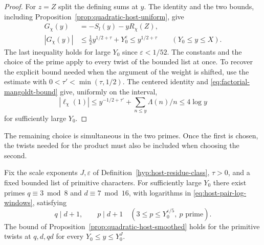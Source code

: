 \begin{proof}
For \(z=Z\) split the defining sums at \(y\). The identity and the
two bounds, including Proposition~\ref{prop:quadratic-host-uniform}, give
\[
 \begin{aligned}
 G_\chi(y)&=-S_l(y)-yR_\chi(Z),\\
 |G_\chi(y)|&\le \tfrac12 y^{1/2+\tau}+Y_0^\varepsilon
             \le y^{1/2+\tau}\qquad (Y_0\le y\le X).
 \end{aligned}
\]
The last inequality holds for large \(Y_0\) since \(\varepsilon<1/52\). The constants and the choice of the prime apply to
every twist of the bounded list at once. To recover the explicit bound needed when the argument of the weight is shifted, use the estimate with \(0<\tau'<\min(\tau,1/2)\). The centered identity and \eqref{eq:factorial-mangoldt-bound} give, uniformly on the interval,
\[
 |\ell_\chi(1)|\le y^{-1/2+\tau'}+\sum_{n\le y}\Lambda(n)/n
              \le 4\log y
\]
for sufficiently large \(Y_0\).

\end{proof}

The remaining choice is simultaneous in the two primes. Once the first is chosen, the
twists needed for the product must also be included when choosing the second.

\begin{proposition}\label{prop:common-host-prime-pair}
Fix the scale exponents \(J,\varepsilon\) of
Definition~\ref{hyp:host-residue-class}, \(\tau>0\), and a fixed
bounded list of primitive characters. For sufficiently large
\(Y_0\) there exist primes \(q\equiv3\bmod8\) and
\(d\equiv7\bmod16\), with logarithms in \eqref{eq:host-pair-log-windows}, satisfying 
\[
 q\mid d+1,\qquad p\mid d+1\quad(3\le p\le Y_0^{\varepsilon/5},\ p\text{ prime}).
\]
 The bound of
Proposition~\ref{prop:quadratic-host-smoothed} holds for the
primitive twists at \(q,d,qd\) for every \(Y_0\le y\le Y_0^J\).
\end{proposition}

